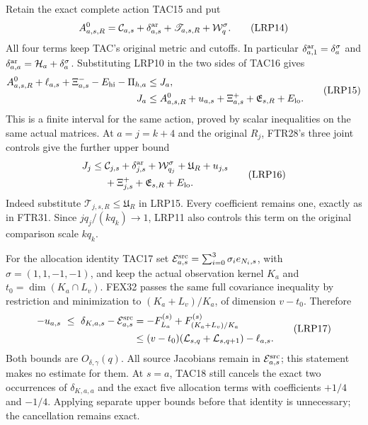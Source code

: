 Retain the exact complete action TAC15 and put
\[
 A^0_{a,s,R}=\mathcal C_{a,s}+\delta_{a,s}^{\rm ar}
            +\mathscr T_{a,s,R}+\mathcal W_q^\sigma.
 \tag{LRP14}
\]
All four terms keep TAC's original metric and cutoffs. In particular
$\delta_{a,1}^{\rm ar}=\delta_a^\sigma$ and
$\delta_{a,a}^{\rm ar}=\mathcal H_a+\delta_a^\sigma$.
Substituting LRP10 in the two sides of TAC16 gives
\[
\begin{split}
 A^0_{a,s,R}+\ell_{a,s}+\Xi^-_{a,s}-E_{\rm hi}-\Pi_{h,a}
       &\le J_a,\\
 J_a&\le A^0_{a,s,R}+u_{a,s}+\Xi^+_{a,s}
                   +\mathfrak E_{s,R}+E_{\rm lo}.
\end{split}\tag{LRP15}
\]
This is a finite interval for the same action, proved by scalar
inequalities on the same actual matrices. At $a=j=k+4$ and the
original $R_j$, FTR28's three joint controls give the further upper bound
\[
\begin{split}
 J_j\le{}&\mathcal C_{j,s}+\delta_{j,s}^{\rm ar}
          +\mathcal W_{q_j}^{\sigma}+\mathfrak U_R+u_{j,s}\\
         &+\Xi^+_{j,s}+\mathfrak E_{s,R}+E_{\rm lo}.
\end{split}\tag{LRP16}
\]
Indeed substitute $\mathscr T_{j,s,R}\le\mathfrak U_R$ in LRP15.
Every coefficient remains one, exactly as in FTR31.
Since $jq_j/(kq_k)\to1$, LRP11 also controls this term on the
original comparison scale $kq_k$.

For the allocation identity TAC17 set
$\mathcal E_{a,s}^{\rm src}=\sum_{i=0}^3\sigma_i e_{N_i,s}$,
with $\sigma=(1,1,-1,-1)$, and keep the actual observation kernel
$K_a$ and $t_0=\dim(K_a\cap L_v)$. FEX32 passes the same full
covariance inequality by restriction and minimization to
$(K_a+L_v)/K_a$, of dimension $v-t_0$. Therefore
\[
\begin{split}
 -u_{a,s}\ \le\
 \delta_{K,a,s}-\mathcal E_{a,s}^{\rm src}
   &=-F_{L_a}^{(s)}+F_{(K_a+L_v)/K_a}^{(s)}\\
   &\le(v-t_0)(\mathcal L_{s,q}+\mathcal L_{s,q+1})-\ell_{a,s}.
\end{split}\tag{LRP17}
\]
Both bounds are $O_{\delta,\gamma}(q)$. All source Jacobians remain
in $\mathcal E_{a,s}^{\rm src}$; this statement makes no estimate
for them. At $s=a$, TAC18 still cancels the exact two occurrences of
$\delta_{K,a,a}$ and the exact five allocation terms with coefficients
$+1/4$ and $-1/4$. Applying separate upper bounds before that identity
is unnecessary; the cancellation remains exact.

